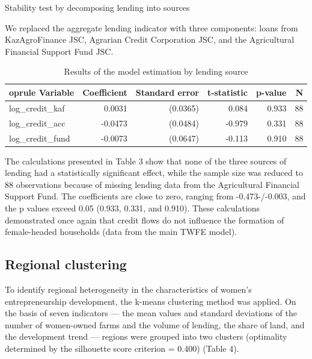 ﻿\documentclass[pdflatex,sn-mathphys-ay]{sn-jnl}
\begin{document}
Stability test by decomposing lending into sources

We replaced the aggregate lending indicator with three components: loans
from KazAgroFinance JSC, Agrarian Credit Corporation JSC, and the
Agricultural Financial Support Fund JSC.

\begin{table}[htbp]
\caption{Results of the model estimation by lending source}\label{tab:lending-source}%
\small
\begin{tabular*}{\textwidth}{@{\extracolsep{\fill}}p{}rrrrr@{}}
	oprule
Variable & Coefficient & Standard error & t-statistic & p-value & N\\
\midrule
log\_credit\_kaf & 0.0031 & (0.0365) & 0.084 & 0.933 & 88\\
log\_credit\_acc & -0.0473 & (0.0484) & -0.979 & 0.331 & 88\\
log\_credit\_fund & -0.0073 & (0.0647) & -0.113 & 0.910 & 88\\
\bottomrule
\end{tabular*}
\end{table}

The calculations presented in Table 3 show that none of the three
sources of lending had a statistically significant effect, while the
sample size was reduced to 88 observations because of missing lending
data from the Agricultural Financial Support Fund. The coefficients are
close to zero, ranging from -0.473-/-0.003, and the p values exceed
0.05 (0.933, 0.331, and 0.910). These calculations demonstrated once
again that credit flows do not influence the formation of female-headed
households (data from the main TWFE model).

\subsection{Regional clustering}

To identify regional heterogeneity in the characteristics of women's
entrepreneurship development, the k-means clustering method was applied.
On the basis of seven indicators --- the mean values and standard
deviations of the number of women-owned farms and the volume of lending,
the share of land, and the development trend --- regions were grouped into
two clusters (optimality determined by the silhouette score criterion =
0.400) (Table 4).
\end{document}
